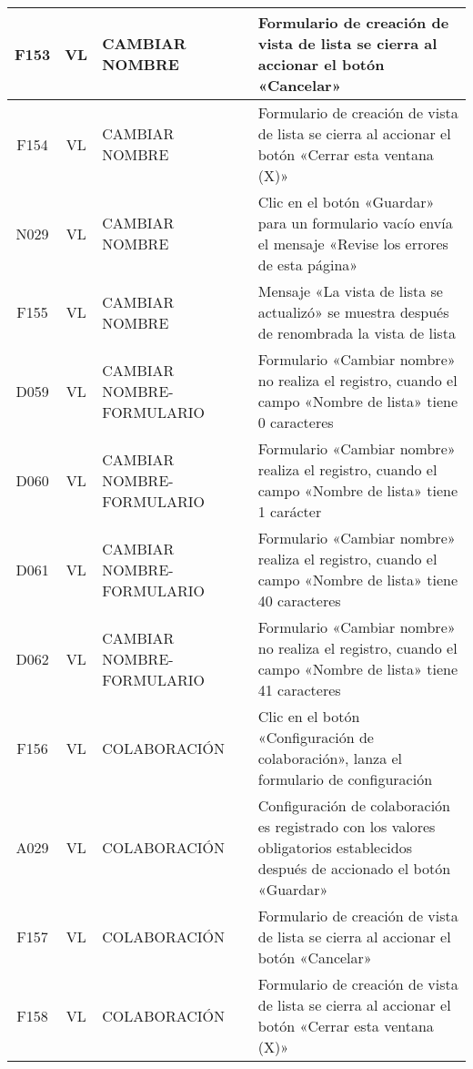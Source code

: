 \begin{landscape}
{\begin{longtable}[htb]{|c|c|p{3.8cm}|p{15.2cm}|}
\scriptsize{F153} & \scriptsize{VL} & \scriptsize{CAMBIAR NOMBRE} & \scriptsize{Formulario de creación de vista de lista se cierra al accionar el botón «Cancelar»} \\ \hline
\scriptsize{F154} & \scriptsize{VL} & \scriptsize{CAMBIAR NOMBRE} & \scriptsize{Formulario de creación de vista de lista se cierra al accionar el botón «Cerrar esta ventana (X)»} \\ \hline
\scriptsize{N029} & \scriptsize{VL} & \scriptsize{CAMBIAR NOMBRE} & \scriptsize{Clic en el botón «Guardar» para un formulario vacío envía el mensaje «Revise los errores de esta página»} \\ \hline
\scriptsize{F155} & \scriptsize{VL} & \scriptsize{CAMBIAR NOMBRE} & \scriptsize{Mensaje «La vista de lista se actualizó» se muestra después de renombrada la vista de lista} \\ \hline
\scriptsize{D059} & \scriptsize{VL} & \scriptsize{CAMBIAR NOMBRE-FORMULARIO} & \scriptsize{Formulario «Cambiar nombre» no realiza el registro, cuando el campo «Nombre de lista» tiene 0 caracteres} \\ \hline
\scriptsize{D060} & \scriptsize{VL} & \scriptsize{CAMBIAR NOMBRE-FORMULARIO} & \scriptsize{Formulario «Cambiar nombre» realiza el registro, cuando el campo «Nombre de lista» tiene 1 carácter} \\ \hline
\scriptsize{D061} & \scriptsize{VL} & \scriptsize{CAMBIAR NOMBRE-FORMULARIO} & \scriptsize{Formulario «Cambiar nombre» realiza el registro, cuando el campo «Nombre de lista» tiene 40 caracteres} \\ \hline
\scriptsize{D062} & \scriptsize{VL} & \scriptsize{CAMBIAR NOMBRE-FORMULARIO} & \scriptsize{Formulario «Cambiar nombre» no realiza el registro, cuando el campo «Nombre de lista» tiene 41 caracteres} \\ \hline
\scriptsize{F156} & \scriptsize{VL} & \scriptsize{COLABORACIÓN} & \scriptsize{Clic en el botón «Configuración de colaboración», lanza el formulario de configuración} \\ \hline
\scriptsize{A029} & \scriptsize{VL} & \scriptsize{COLABORACIÓN} & \scriptsize{Configuración de colaboración es registrado con los valores obligatorios establecidos después de accionado el botón «Guardar»} \\ \hline
\scriptsize{F157} & \scriptsize{VL} & \scriptsize{COLABORACIÓN} & \scriptsize{Formulario de creación de vista de lista se cierra al accionar el botón «Cancelar»} \\ \hline
\scriptsize{F158} & \scriptsize{VL} & \scriptsize{COLABORACIÓN} & \scriptsize{Formulario de creación de vista de lista se cierra al accionar el botón «Cerrar esta ventana (X)»} \\ \hline

\end{longtable}}
\end{landscape}
